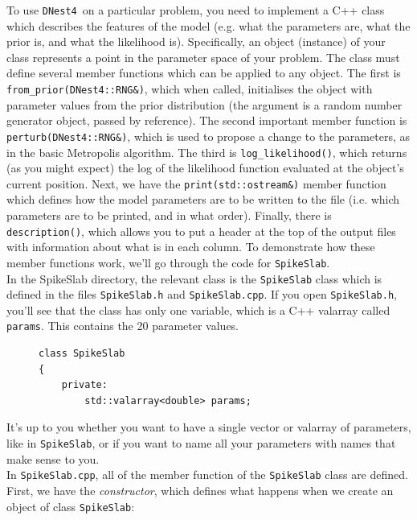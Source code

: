 \documentclass[a4paper, 11pt]{article}
\newcommand{\dnest}{{\tt DNest4}}
\begin{document}
To use \dnest~on a particular problem, you need to implement a C++ class
which describes the features of the model (e.g. what the parameters are,
what the prior is, and what the likelihood is). Specifically, an object
(instance) of your class represents a point in the parameter space of your
problem. The class must define several member functions which can be
applied to any object. The first is {\tt from\_prior(DNest4::RNG\&)},
which when called,
initialises the object with parameter values from the prior distribution
(the argument is a random number generator object, passed by reference).
The second important member function is {\tt perturb(DNest4::RNG\&)}, which is used to propose
a change to the parameters, as in the basic Metropolis algorithm. The third
is {\tt log\_likelihood()}, which returns (as you might expect)
the log of the likelihood function evaluated at the object's current position. Next,
we have the {\tt print(std::ostream\&)} member function which defines how the model
parameters are to be written to the file (i.e. which parameters are to be
printed, and in what order). Finally, there is {\tt description()},
which allows you to put a header at the top of the output files with information
about what is in each column. To demonstrate how these member functions work, we'll go
through the code for {\tt SpikeSlab}.\\

In the SpikeSlab directory,
the relevant class is the {\tt SpikeSlab} class which is defined in the files
{\tt SpikeSlab.h} and {\tt SpikeSlab.cpp}. If you open {\tt SpikeSlab.h},
you'll see that the class has only one variable, which is a C++ valarray called
{\tt params}. This contains the 20 parameter values.\\

\begin{figure}
\begin{framed}
\begin{verbatim}
class SpikeSlab
{
    private:
        std::valarray<double> params;
\end{verbatim}
\end{framed}
\end{figure}

It's up to you whether you want to have a single vector or valarray of parameters, like
in {\tt SpikeSlab}, or if you want to name all your parameters with names that
make sense to you.\\

In {\tt SpikeSlab.cpp}, all of the member function of the {\tt SpikeSlab} class
are defined. First, we have the {\it constructor}, which defines what happens
when we create an object of class {\tt SpikeSlab}:\\
\end{document}
